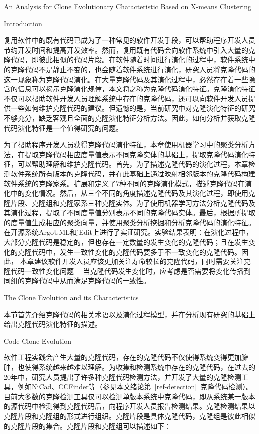 
{An Analysis for Clone Evolutionary Characteristic Based on X-means Clustering}

{Introduction}

复用软件中的既有代码已成为了一种常见的软件开发手段，可以帮助程序开发人员节约开发时间和提高开发效率。然而，复用既有代码会向软件系统中引入大量的克隆代码，即彼此相似的代码片段。在软件随着时间进行演化的过程中，软件系统中的克隆代码不是静止不变的，也会随着软件系统进行演化，研究人员将克隆代码的这一现象称为克隆代码演化。在大量克隆代码及其演化过程中，必然存在着一些隐含的信息可以揭示克隆演化规律，本文将之称为克隆代码演化特征。克隆演化特征不仅可以帮助软件开发人员理解系统中存在的克隆代码，还可以向软件开发人员提供一些如何维护克隆代码的建议。但遗憾的是，当前研究中对克隆演化特征的研究不够充分，缺乏客观且全面的克隆演化特征分析方法。因此，如何分析并获取克隆代码演化特征是一个值得研究的问题。

为了帮助程序开发人员获得克隆代码演化特征，本章使用机器学习中的聚类分析方法，在提取克隆代码相应度量值表示不同克隆实体的基础上，提取克隆代码演化特征，可以帮助理解和维护克隆代码。首先，为了描述克隆代码的演化过程，本章检测软件系统所有版本的克隆代码，并在此基础上通过映射相邻版本的克隆代码构建软件系统的克隆家系。扩展和定义了7种不同的克隆演化模式，描述克隆代码在演化中的变化情况。然后，从三个不同的角度描述克隆代码及其演化过程，即使用克隆片段、克隆组和克隆家系三种克隆实体。为了使用机器学习方法分析克隆代码及其演化过程，提取了不同度量值分别表示不同的克隆代码实体。最后，根据所提取的度量值生成相应的聚类向量，并使用聚类分析挖掘和分析克隆代码的演化特征。在开源系统ArgoUML和jEdit上进行了实证研究。实验结果表明：在演化过程中，大部分克隆代码是稳定的，但也存在一定数量的发生变化的克隆代码；且在发生变化的克隆代码中，发生一致性变化的克隆代码要多于不一致变化的克隆代码。因此， 本章建议软件开发人员应该更加关注寿命较长的克隆代码，同时需要关注克隆代码一致性变化问题----当克隆代码发生变化时，应考虑是否需要将变化传播到同组的克隆代码中从而满足克隆代码的一致性。

{The Clone Evolution and its Characteristics}

本节首先介绍克隆代码的相关术语以及演化过程模型，并在分析现有研究的基础上给出克隆代码演化特征的描述。

{Code Clone Evolution}
\label{lab-evolution}

软件工程实践会产生大量的克隆代码，存在的克隆代码不仅使得系统变得更加臃肿，也使得系统越来越难以理解。为收集和检测系统中存在的克隆代码，在过去的20年中，研究人员提出了许多种克隆代码检测方法，并开发了大量的克隆检测工具，例如NiCad\cite{roy2008nicad}、CCFinder\cite{kamiya2002ccfinder}等（参见本文绪论第~\ref{ref-detection}~克隆代码检测）。目前大多数的克隆检测工具仅可以检测单版本系统中克隆代码，即从系统某一版本的源代码中检测得到克隆代码后，向程序开发人员报告检测结果。克隆检测结果以克隆片段和克隆组的形式进行组织。克隆片段是具体克隆代码，克隆组是彼此相似的克隆片段的集合。克隆片段和克隆组可以描述如下：\\

